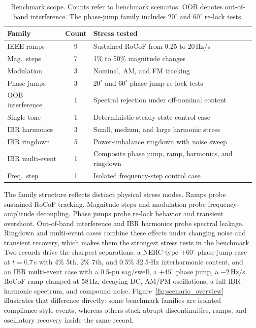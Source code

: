 \begin{table}[t]
  \centering
  \caption{Benchmark scope. Counts refer to benchmark scenarios. OOB denotes
    out-of-band interference. The phase-jump family includes $20^\circ$ and
    $60^\circ$ re-lock tests.}
  \label{tab:benchmark_scope}
  \scriptsize
  \setlength{\tabcolsep}{3pt}
  \renewcommand{\arraystretch}{1.08}
  \begin{tabular}{L{1.7cm} c L{3.95cm}}
    \toprule
    Family & Count & Stress tested \\
    \midrule
    IEEE ramps & 9 & Sustained RoCoF from 0.25 to 20\,Hz/s \\
    Mag.\ steps & 7 & 1\% to 50\% magnitude changes \\
    Modulation & 3 & Nominal, AM, and FM tracking \\
    Phase jumps & 3 & $20^\circ$ and $60^\circ$ phase-jump re-lock tests \\
    OOB interference & 1 & Spectral rejection under off-nominal content \\
    Single-tone & 1 & Deterministic steady-state control case \\
    IBR harmonics & 3 & Small, medium, and large harmonic stress \\
    IBR ringdown & 5 & Power-imbalance ringdown with noise sweep \\
    IBR multi-event & 1 & Composite phase jump, ramp, harmonics, and ringdown \\
    Freq.\ step & 1 & Isolated frequency-step control case \\
    \bottomrule
  \end{tabular}
\end{table}

The family structure reflects distinct physical stress modes. Ramps probe
sustained RoCoF tracking. Magnitude steps and modulation probe
frequency-amplitude decoupling. Phase jumps probe re-lock behavior and
transient overshoot. Out-of-band interference and IBR harmonics probe spectral
leakage. Ringdown and multi-event cases combine these effects under changing
noise and transient recovery, which makes them the strongest stress tests in
the benchmark. Two records drive the sharpest separations: a NERC-type
$+60^\circ$ phase-jump case at $t=0.7$\,s with 4\% 5th, 2\% 7th, and 0.5\%
32.5-Hz interharmonic content, and an IBR multi-event case with a 0.5-pu
sag/swell, a $+45^\circ$ phase jump, a $-2$\,Hz/s RoCoF ramp clamped at
58\,Hz, decaying DC, AM/PM oscillations, a full IBR harmonic spectrum, and
compound noise. Figure~\ref{fig:scenario_overview} illustrates that
difference directly: some benchmark families are isolated compliance-style
events, whereas others stack abrupt discontinuities, ramps, and oscillatory
recovery inside the same record.

